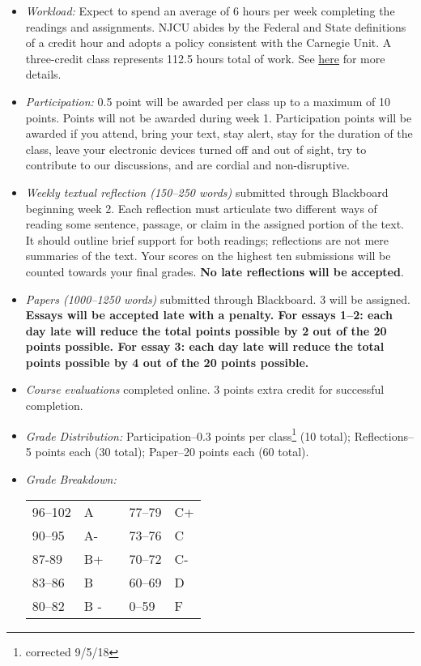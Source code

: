 \documentclass[article,oneside]{memoir}
\begin{document}
\begin{itemize}
\item \textit{Workload:} Expect to spend an average of 6 hours per week completing the readings and assignments. NJCU abides by the Federal and State definitions of a credit hour and adopts a policy consistent with the Carnegie Unit. A three-credit class represents 112.5 hours total of work. See \href{http://scottoconnor.org/resources/Credit.pdf}{here} for more details.

\item \textit{Participation:} 0.5 point will be awarded per class up to a maximum of 10 points. Points will not be awarded during week 1. Participation points will be awarded if you attend, bring your text, stay alert, stay for the duration of the class, leave your electronic devices turned off and out of sight, try to contribute to our discussions, and are cordial and non-disruptive. 


\item \textit{Weekly textual reflection (150--250 words)} submitted through Blackboard beginning week 2. Each reflection must articulate two different ways of reading some sentence, passage, or claim in the assigned portion of the text. It should outline brief support for both readings; reflections are not mere summaries of the text. Your scores on the highest ten submissions will be counted towards your final grades. \textbf{No late reflections will be accepted}.



\item \textit{Papers  (1000--1250 words) } submitted through Blackboard. 3 will be assigned. \textbf{Essays will be accepted late with a penalty. For essays 1--2: each day late will reduce the total points possible by 2 out of the 20 points possible. For essay 3: each day late will reduce the total points possible by 4 out of the 20 points possible.}  

\item \textit{Course evaluations} completed online. 3 points extra credit for successful completion.

\item \textit{Grade Distribution:} Participation--0.3 points per class\footnote{corrected 9/5/18} (10 total); Reflections--5 points each (30 total); Paper--20 points each (60 total). 

\item \textit{Grade Breakdown:}

 \begin{tabular}{ | l | l | p{2cm} | l | l | }
    \hline 
96--102 & A  & &  77--79 &  C+ \\  
90--95 & A- & &  73--76 & C \\
87-89 & B+ &  &  70--72 & C- \\ 
83--86 & B  & &  60--69 & D\\
80--82 & B - & & 0--59 & F\\ \hline
    \end{tabular}


\end{itemize}
\end{document}
